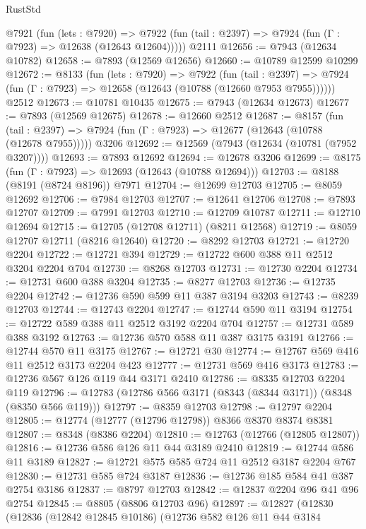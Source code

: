 \begin{lexlean}{RustStd}
\begin{coremodule}
{\begin{coremodule}
{{{{{{{{{{{{{{{{{{{{{{{{{{{{{{{{{{{{{{{{{{{{{{{{{{    @7921
      (fun (lets : @7920) =>
      @7922 (fun (tail : @2397) => @7924 (fun (Γ : @7923) => @12638 (@12643 @12604)))))
    @2111
@12656 := @7943 (@12634 @10782)
@12658 := @7893 (@12569 @12656)
@12660 := @10789 @12599 @10299
@12672 := @8133
    (fun (lets : @7920) =>
    @7922
      (fun (tail : @2397) =>
      @7924 (fun (Γ : @7923) => @12658 (@12643 (@10788 (@12660 @7953 @7955))))))
    @2512
@12673 := @10781 @10435
@12675 := @7943 (@12634 @12673)
@12677 := @7893 (@12569 @12675)
@12678 := @12660 @2512
@12687 := @8157
    (fun (tail : @2397) => @7924 (fun (Γ : @7923) => @12677 (@12643 (@10788 (@12678 @7955)))))
    @3206
@12692 := @12569 (@7943 (@12634 (@10781 (@7952 @3207))))
@12693 := @7893 @12692
@12694 := @12678 @3206
@12699 := @8175 (fun (Γ : @7923) => @12693 (@12643 (@10788 @12694)))
@12703 := @8188 (@8191 (@8724 @8196)) @7971
@12704 := @12699 @12703
@12705 := @8059 @12692
@12706 := @7984 @12703
@12707 := @12641 @12706
@12708 := @7893 @12707
@12709 := @7991 @12703
@12710 := @12709 @10787
@12711 := @12710 @12694
@12715 := @12705 (@12708 @12711) (@8211 @12568)
@12719 := @8059 @12707 @12711 (@8216 @12640)
@12720 := @8292 @12703
@12721 := @12720 @2204
@12722 := @12721 @394
@12729 := @12722 @600 @388 @11 @2512 @3204 @2204 @704
@12730 := @8268 @12703
@12731 := @12730 @2204
@12734 := @12731 @600 @388 @3204
@12735 := @8277 @12703
@12736 := @12735 @2204
@12742 := @12736 @590 @599 @11 @387 @3194 @3203
@12743 := @8239 @12703
@12744 := @12743 @2204
@12747 := @12744 @590 @11 @3194
@12754 := @12722 @589 @388 @11 @2512 @3192 @2204 @704
@12757 := @12731 @589 @388 @3192
@12763 := @12736 @570 @588 @11 @387 @3175 @3191
@12766 := @12744 @570 @11 @3175
@12767 := @12721 @30
@12774 := @12767 @569 @416 @11 @2512 @3173 @2204 @423
@12777 := @12731 @569 @416 @3173
@12783 := @12736 @567 @126 @119 @44 @3171 @2410
@12786 := @8335 @12703 @2204 @119
@12796 := @12783 (@12786 @566 @3171 (@8343 (@8344 @3171)) (@8348 (@8350 @566 @119)))
@12797 := @8359 @12703
@12798 := @12797 @2204
@12805 := @12774 (@12777 (@12796 @12798)) @8366 @8370 @8374 @8381
@12807 := @8348 (@8386 @2204)
@12810 := @12763 (@12766 (@12805 @12807))
@12816 := @12736 @586 @126 @11 @44 @3189 @2410
@12819 := @12744 @586 @11 @3189
@12827 := @12721 @575 @585 @724 @11 @2512 @3187 @2204 @767
@12830 := @12731 @585 @724 @3187
@12836 := @12736 @185 @584 @41 @387 @2754 @3186
@12837 := @8797 @12703
@12842 := @12837 @2204 @96 @41 @96 @2754
@12845 := @8805 (@8806 @12703 @96)
@12897 := @12827
    (@12830
      (@12836
        (@12842 @12845 @10186)
        (@12736
          @582
          @126
          @11
          @44
          @3184
}}}}}}}}}}}}}}}}}}}}}}}}}}}}}}}}}}}}}}}}}}}}}}}}}}
\end{coremodule}}
\end{coremodule}
\end{lexlean}

